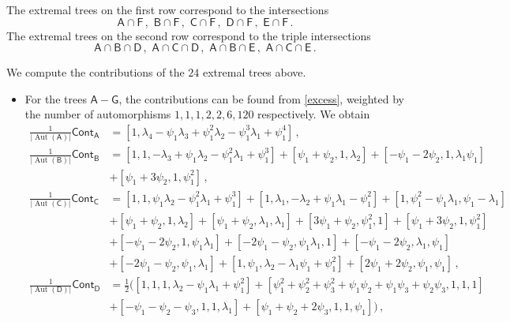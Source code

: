 \documentclass[11pt]{amsart}
\theoremstyle{definition}
\DeclareMathOperator{\Aut}{Aut}
\begin{document}
{\begin{center}
\begin{tikzpicture}[scale=.4]
\end{tikzpicture}
\end{center}
The extremal trees on the first row correspond to the intersections $$\mathsf A\cap \mathsf F\, ,\,\, \mathsf B\cap \mathsf F\, ,\,\,\mathsf C\cap \mathsf F\, ,\,\,\mathsf D\cap \mathsf F\, , \,\,\mathsf E\cap \mathsf F\,.$$ The extremal trees on the second row correspond to the triple intersections 
$$\mathsf A\cap \mathsf B\cap \mathsf D\, , \,\,\mathsf A\cap \mathsf C\cap \mathsf D\, ,\,\, \mathsf A\cap \mathsf B\cap \mathsf E\, ,\,\, \mathsf A\cap \mathsf C\cap \mathsf E\,.$$ 

We compute the contributions of the $24$ extremal trees above.

\begin{itemize}
\item [(i)] For the trees $\mathsf A-\mathsf G$, the contributions can be found from \eqref{excess}, weighted by the number of automorphisms $1, 1, 1, 2, 2, 6, 120$ respectively. We obtain
\begin{align*}
\frac{1}{|\Aut(\mathsf{A})|}\mathsf{Cont}_{\mathsf A}&=[1, \lambda_4-\psi_1\lambda_3+\psi_1^2\lambda_2-\psi_1^3\lambda_1+\psi_1^4]\,, \\
\frac{1}{|\Aut(\mathsf{B})|}\mathsf{Cont}_{\mathsf B}&=[1, 1, -\lambda_3+\psi_1\lambda_2-\psi_1^2\lambda_1+\psi_1^3]+[\psi_1+\psi_2,1, \lambda_2]+[-\psi_1-2\psi_2,1, \lambda_1\psi_1]\\&+[\psi_1+3\psi_2,1, \psi_1^2]\,,\\
\frac{1}{|\Aut(\mathsf{C})|}\mathsf{Cont}_{\mathsf C}&=[1, 1, \psi_1\lambda_2-\psi_1^2\lambda_1+\psi_1^3]+[1, \lambda_1, -\lambda_2+\psi_1\lambda_1-\psi_1^2]+[1,\psi_1^2-\psi_1\lambda_1, \psi_1-\lambda_1]\\&+[\psi_1+\psi_2, 1, \lambda_2]+[\psi_1+\psi_2,\lambda_1,\lambda_1]+[3\psi_1+\psi_2,\psi_1^2, 1]+[\psi_1+3\psi_2, 1, \psi_1^2]\\&+[-\psi_1-2\psi_2, 1, \psi_1\lambda_1]+[-2\psi_1-\psi_2,\psi_1\lambda_1, 1]+[-\psi_1-2\psi_2,\lambda_1, \psi_1]\\&+[-2\psi_1-\psi_2,\psi_1, \lambda_1]+[1, \psi_1, \lambda_2-\lambda_1\psi_1+\psi_1^2]+[2\psi_1+2\psi_2,\psi_1,\psi_1]\,,
\\
\frac{1}{|\Aut(\mathsf{D})|}\mathsf{Cont}_{\mathsf D}&=\frac{1}{2}([1, 1, 1, \lambda_2-\psi_1\lambda_1+\psi_1^2]+[\psi_1^2+\psi_2^2+\psi_3^2+\psi_1\psi_2+\psi_1\psi_3+\psi_2\psi_3, 1, 1, 1]\\
&+[-\psi_1-\psi_2-\psi_3, 1, 1, \lambda_1]+[\psi_1+\psi_2+2\psi_3, 1, 1, \psi_1])\,,\\

\end{align*}
\end{itemize}}
\end{document}
